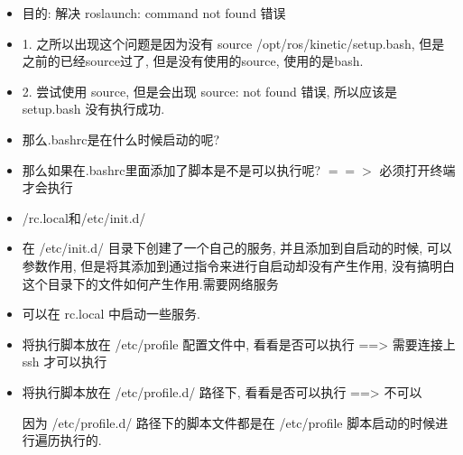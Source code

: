 \begin{itemize}
    \item 目的: 解决 roslaunch: command not found 错误
    \item 1. 之所以出现这个问题是因为没有 source /opt/ros/kinetic/setup.bash, 但是之前的已经source过了, 但是没有使用的source, 使用的是bash. 
    \item 2. 尝试使用 source, 但是会出现 source: not found 错误, 所以应该是 setup.bash 没有执行成功. 
    \item 那么.bashrc是在什么时候启动的呢? 
    \item 那么如果在.bashrc里面添加了脚本是不是可以执行呢? $==>$ 必须打开终端才会执行
    \item /rc.local和/etc/init.d/
    \item 在 /etc/init.d/ 目录下创建了一个自己的服务, 并且添加到自启动的时候, 可以参数作用, 但是将其添加到通过指令来进行自启动却没有产生作用, 没有搞明白这个目录下的文件如何产生作用.需要网络服务
    \item 可以在 rc.local 中启动一些服务. 
\end{itemize}

\begin{itemize}
    \item 将执行脚本放在 /etc/profile 配置文件中, 看看是否可以执行 ==> 需要连接上 ssh 才可以执行
    \item 将执行脚本放在 /etc/profile.d/ 路径下, 看看是否可以执行 ==> 不可以 \par
    因为 /etc/profile.d/ 路径下的脚本文件都是在 /etc/profile 脚本启动的时候进行遍历执行的. 
\end{itemize}

